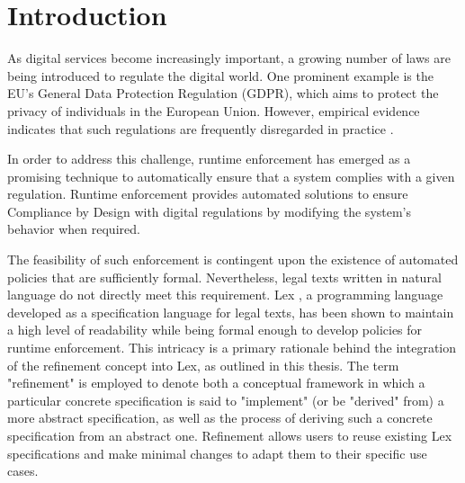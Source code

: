 \chapter{Introduction}
\label{chapter:introdcution}



As digital services become increasingly important, a growing number of laws are being introduced to regulate the digital world.
One prominent example is the EU's General Data Protection Regulation (GDPR), which aims to protect the privacy of individuals in the European Union.
However, empirical evidence indicates that such regulations are frequently disregarded in practice \cite{lancieri2022narrowing}.

In order to address this challenge, runtime enforcement has emerged as a promising technique to automatically ensure that a system complies with a given regulation.
Runtime enforcement provides automated solutions to ensure Compliance by Design with digital regulations by modifying the system's behavior when required.

The feasibility of such enforcement is contingent upon the existence of automated policies that are sufficiently formal.
Nevertheless, legal texts written in natural language do not directly meet this requirement.
Lex \cite{lex, semesterproject}, a programming language developed as a specification language for legal texts, has been shown to maintain a high level of readability while being formal enough to develop policies for runtime enforcement.
This intricacy is a primary rationale behind the integration of the refinement concept into Lex, as outlined in this thesis.
The term "refinement" is employed to denote both a conceptual framework in which a particular concrete specification is said to "implement" (or be "derived" from) a more abstract specification, as well as the process of deriving such a concrete specification from an abstract one.
Refinement allows users to reuse existing Lex specifications and make minimal changes to adapt them to their specific use cases.


